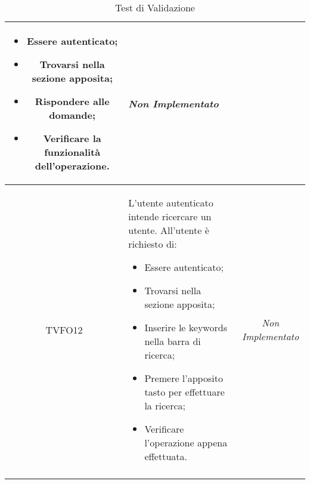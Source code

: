 \begin{longtable}[ht]{|c|>{}m{8cm}|c|}
\begin{itemize}
\item Essere autenticato;
\item Trovarsi nella sezione apposita;
\item Rispondere alle domande;
\item Verificare la funzionalità dell'operazione.
\end{itemize} & \textit{Non Implementato}\\ \hline
\hypertarget{TVFO12}{TVFO12} & L’utente autenticato  intende ricercare un utente. All’utente è richiesto di:
\begin{itemize}
\item Essere autenticato;
\item Trovarsi nella sezione apposita;
\item Inserire le keywords nella barra di ricerca;
\item Premere l'apposito tasto per effettuare la ricerca;
\item Verificare l’operazione appena effettuata.
\end{itemize} & \textit{Non Implementato}\\ \hline
\caption[Test di Validazione]{Test di Validazione}
\label{tabella:test0}
\end{longtable}
\clearpage
